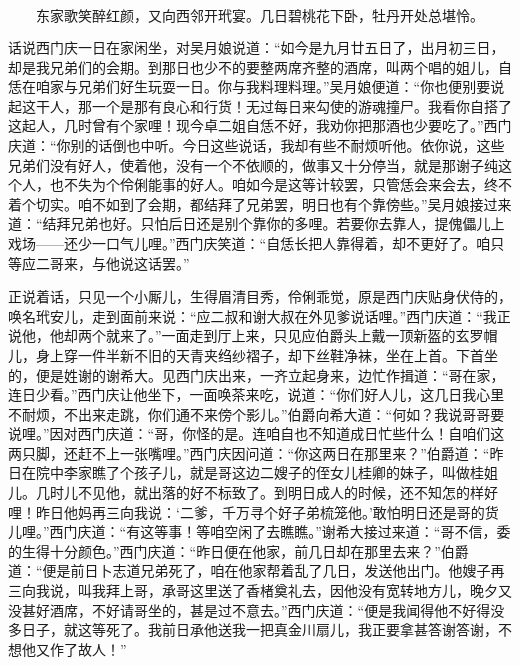 \[
东家歌笑醉红颜，又向西邻开玳宴。
几日碧桃花下卧，牡丹开处总堪怜。
\]

话说西门庆一日在家闲坐，对吴月娘说道：“如今是九月廿五日了，出月初三日，却是我兄弟们的会期。到那日也少不的要整两席齐整的酒席，叫两个唱的姐儿，自恁在咱家与兄弟们好生玩耍一日。你与我料理料理。”吴月娘便道：“你也便别要说起这干人，那一个是那有良心和行货！无过每日来勾使的游魂撞尸。我看你自搭了这起人，几时曾有个家哩！现今卓二姐自恁不好，我劝你把那酒也少要吃了。”西门庆道：“你别的话倒也中听。今日这些说话，我却有些不耐烦听他。依你说，这些兄弟们没有好人，使着他，没有一个不依顺的，做事又十分停当，就是那谢子纯这个人，也不失为个伶俐能事的好人。咱如今是这等计较罢，只管恁会来会去，终不着个切实。咱不如到了会期，都结拜了兄弟罢，明日也有个靠傍些。”吴月娘接过来道：“结拜兄弟也好。只怕后日还是别个靠你的多哩。若要你去靠人，提傀儡儿上戏场——还少一口气儿哩。”西门庆笑道：“自恁长把人靠得着，却不更好了。咱只等应二哥来，与他说这话罢。”

正说着话，只见一个小厮儿，生得眉清目秀，伶俐乖觉，原是西门庆贴身伏侍的，唤名玳安儿，走到面前来说：“应二叔和谢大叔在外见爹说话哩。”西门庆道：“我正说他，他却两个就来了。”一面走到厅上来，只见应伯爵头上戴一顶新盔的玄罗帽儿，身上穿一件半新不旧的天青夹绉纱褶子，却下丝鞋净袜，坐在上首。下首坐的，便是姓谢的谢希大。见西门庆出来，一齐立起身来，边忙作揖道：“哥在家，连日少看。”西门庆让他坐下，一面唤茶来吃，说道：“你们好人儿，这几日我心里不耐烦，不出来走跳，你们通不来傍个影儿。”伯爵向希大道：“何如？我说哥哥要说哩。”因对西门庆道：“哥，你怪的是。连咱自也不知道成日忙些什么！自咱们这两只脚，还赶不上一张嘴哩。”西门庆因问道：“你这两日在那里来？”伯爵道：“昨日在院中李家瞧了个孩子儿，就是哥这边二嫂子的侄女儿桂卿的妹子，叫做桂姐儿。几时儿不见他，就出落的好不标致了。到明日成人的时候，还不知怎的样好哩！昨日他妈再三向我说：‘二爹，千万寻个好子弟梳笼他。’敢怕明日还是哥的货儿哩。”西门庆道：“有这等事！等咱空闲了去瞧瞧。”谢希大接过来道：“哥不信，委的生得十分颜色。”西门庆道：“昨日便在他家，前几日却在那里去来？”伯爵道：“便是前日卜志道兄弟死了，咱在他家帮着乱了几日，发送他出门。他嫂子再三向我说，叫我拜上哥，承哥这里送了香楮奠礼去，因他没有宽转地方儿，晚夕又没甚好酒席，不好请哥坐的，甚是过不意去。”西门庆道：“便是我闻得他不好得没多日子，就这等死了。我前日承他送我一把真金川扇儿，我正要拿甚答谢答谢，不想他又作了故人！”

